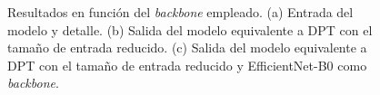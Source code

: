 \begin{figure}[!ht]
\hspace{-3mm}
       
\caption{Resultados en función del \textit{backbone} empleado. (a) Entrada del modelo y detalle. (b) Salida del modelo equivalente a DPT con el tamaño de entrada reducido. (c) Salida del modelo equivalente a DPT con el tamaño de entrada reducido y EfficientNet-B0 como \textit{backbone}.}
    \label{fig:cualitativa-2}
    \end{figure}
\captionsetup[subfigure]{labelformat=parens}
















